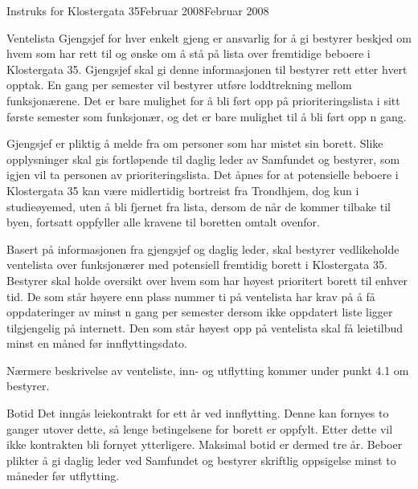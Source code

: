 \documentclass[fsbok.tex]{subfiles}
\begin{document}
\begin{instruks}{Instruks for Klostergata 35}{Februar 2008}{Februar 2008}
    \begin{instruksledd}{Ventelista}
        Gjengsjef for hver enkelt gjeng er ansvarlig for å gi bestyrer beskjed om hvem som
        har rett til og ønske om å stå på
        lista over fremtidige beboere i Klostergata 35. Gjengsjef skal gi denne
        informasjonen til bestyrer rett etter hvert
        opptak. En gang per semester vil bestyrer utføre loddtrekning mellom
        funksjonærene. Det er bare mulighet for å bli
        ført opp på prioriteringslista i sitt første semester som funksjonær, og det er
        bare mulighet til å bli ført opp n gang.
        
        Gjengsjef er pliktig å melde fra om personer som har mistet sin borett. Slike
        opplysninger skal gis fortløpende til
        daglig leder av Samfundet og bestyrer, som igjen vil ta personen av
        prioriteringslista. Det åpnes for at potensielle
        beboere i Klostergata 35 kan være midlertidig bortreist fra Trondhjem, dog kun i
        studieøyemed, uten å bli fjernet fra
        lista, dersom de når de kommer tilbake til byen, fortsatt oppfyller alle kravene
        til boretten omtalt ovenfor.
        
        Basert på informasjonen fra gjengsjef og daglig leder, skal bestyrer vedlikeholde
        ventelista over funksjonærer med
        potensiell fremtidig borett i Klostergata 35. Bestyrer skal holde oversikt over
        hvem som har høyest prioritert borett til
        enhver tid. De som står høyere enn plass nummer ti på ventelista har krav på å få
        oppdateringer av minst n gang per
        semester dersom ikke oppdatert liste ligger tilgjengelig på internett. Den som
        står høyest opp på ventelista skal få
        leietilbud minst en måned før innflyttingsdato.
        
        Nærmere beskrivelse av venteliste, inn- og utflytting kommer under punkt 4.1 om
        bestyrer.
    \end{instruksledd}

    \begin{instruksledd}{Botid}
        Det inngås leiekontrakt for ett år ved innflytting. Denne kan fornyes to ganger
        utover dette, så lenge betingelsene for
        borett er oppfylt. Etter dette vil ikke kontrakten bli fornyet ytterligere.
        Maksimal botid er dermed tre år. Beboer plikter
        å gi daglig leder ved Samfundet og bestyrer skriftlig oppsigelse minst to måneder
        før utflytting.
    \end{instruksledd}


\end{instruks}
\end{document}
